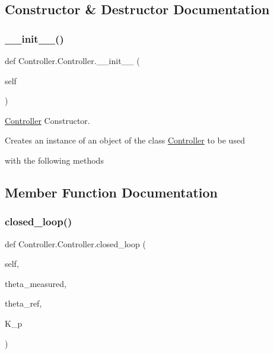 \subsection{Constructor \& Destructor Documentation}
\mbox{\label{classController_1_1Controller_ae584317363efa29ace5c4294ff9675a2}} 
\subsubsection{\texorpdfstring{\+\_\+\+\_\+init\+\_\+\+\_\+()}{\_\_init\_\_()}}
{\footnotesize\ttfamily def Controller.\+Controller.\+\_\+\+\_\+init\+\_\+\+\_\+ (\begin{DoxyParamCaption}\item[{}]{self }\end{DoxyParamCaption})}



\mbox{\hyperlink{classController_1_1Controller}{Controller}} Constructor. 

Creates an instance of an object of the class \mbox{\hyperlink{classController_1_1Controller}{Controller}} to be used

with the following methods 

\subsection{Member Function Documentation}
\mbox{\label{classController_1_1Controller_aedd405d67a7fc1b0ae1c4c50eb5eaf4d}} 
\subsubsection{\texorpdfstring{closed\+\_\+loop()}{closed\_loop()}}
{\footnotesize\ttfamily def Controller.\+Controller.\+closed\+\_\+loop (\begin{DoxyParamCaption}\item[{}]{self,  }\item[{}]{theta\+\_\+measured,  }\item[{}]{theta\+\_\+ref,  }\item[{}]{K\+\_\+p }\end{DoxyParamCaption})}



